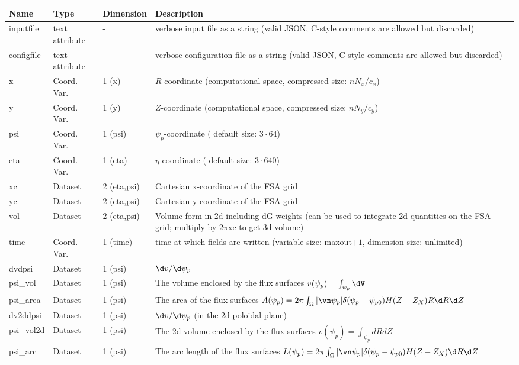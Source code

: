 \begin{longtable}{lll>{\RaggedRight}p{7cm}}
\toprule
\rowcolor{gray!50}\textbf{Name} &  \textbf{Type} & \textbf{Dimension} & \textbf{Description}  \\ \midrule
inputfile  &     text attribute & - & verbose input file as a string (valid JSON, C-style comments are allowed but discarded) \\
configfile   &     text attribute & - & verbose configuration file as a string (valid JSON, C-style comments are allowed but discarded) \\
x                & Coord. Var. & 1 (x) & $R$-coordinate (computational space, compressed size: $nN_x/c_x$)\\
y                & Coord. Var. & 1 (y) & $Z$-coordinate (computational space, compressed size: $nN_y/c_y$)\\
psi              & Coord. Var. & 1 (psi) & $\psi_p$-coordinate ( default size: $3\cdot 64$) \\
eta              & Coord. Var. & 1 (eta) & $\eta$-coordinate ( default size: $3\cdot 640$) \\
xc               & Dataset & 2 (eta,psi) & Cartesian x-coordinate of the FSA grid \\
yc               & Dataset & 2 (eta,psi) & Cartesian y-coordinate of the FSA grid\\
vol              & Dataset & 2 (eta,psi) & Volume form in 2d including dG weights (can be used to integrate 2d quantities on the FSA grid; multiply by $2\pi$xc to get 3d volume)  \\
time             & Coord. Var. & 1 (time)& time at which fields are written (variable size: maxout$+1$, dimension size: unlimited) \\
dvdpsi           & Dataset & 1 (psi) & $\d v/\d\psi_p$ \\
psi\_vol         & Dataset & 1 (psi) & The volume enclosed by the flux surfaces $v(\psi_p) = \int_{\psi_p} \dV $ \\
psi\_area        & Dataset & 1 (psi) & The area of the flux surfaces $A(\psi_p) = 2\pi \int_\Omega |\vn\psi_p| \delta(\psi_p - \psi_{p0}) H(Z-Z_X) R\d R\d Z$ \\
dv2ddpsi         & Dataset & 1 (psi) & $\d v/\d\psi_p$ (in the 2d poloidal plane) \\
psi\_vol2d       & Dataset & 1 (psi) & The 2d volume enclosed by the flux surfaces $v(\psi_p) = \int_{\psi_p} dRdZ $ \\
psi\_arc         & Dataset & 1 (psi) & The arc length of the flux surfaces $L(\psi_p) = 2\pi \int_\Omega |\vn\psi_p| \delta(\psi_p - \psi_{p0}) H(Z-Z_X) \d R\d Z$ \\

\end{longtable}
